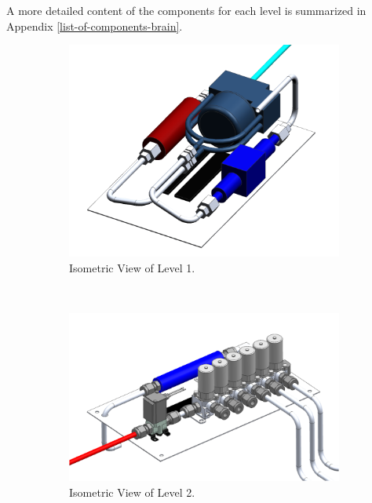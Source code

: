 \documentclass[a4paper,12pt,twoside]{article}
\begin{document}
A more detailed content of the components for each level is summarized in Appendix \ref{list-of-components-brain}.
\begin{figure}[H]
    \centering
    \begin{subfigure}[b]{0.3\textwidth}
    \centering
    \includegraphics[width=\textwidth]{4-experiment-design/img/Mechanical/Level_1.png}
    \caption{Isometric View of Level 1.}
    \label{level_1}
    \end{subfigure}
    ~
    \begin{subfigure}[b]{0.3\textwidth}
    \centering
    \includegraphics[width=\textwidth]{4-experiment-design/img/Mechanical/Level_2.png}
    \caption{Isometric View of Level 2.}
    \label{level_2}
    \end{subfigure}
    ~
    \begin{subfigure}[b]{0.3\textwidth}

\end{subfigure}
\end{figure}
\end{document}
